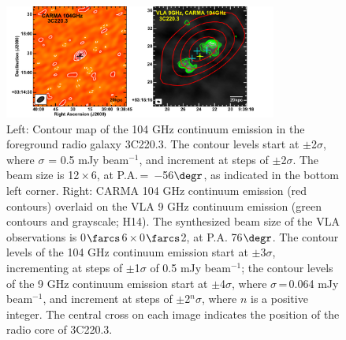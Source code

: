 \documentclass[twocolumn,apj,numberedappendix]{emulateapj}
\newcommand{\CO}{\mbox{CO($J$\,=\,3\,$\rightarrow$\,2) }}
\newcommand{\pmOne}{\mbox{$^{-1}$}}
\begin{document}
\begin{figure}[tbph]
\centering
\includegraphics[width=0.80\textwidth]{Figure/ContPanel.pdf}
\caption{Left: Contour map of the 104 GHz continuum emission in the foreground radio galaxy 3C220.3. 
The contour levels start at $\pm$2$\sigma$, where $\sigma$ = 0.5 mJy beam\pmOne, and 
increment at steps 
of $\pm$2$\sigma$. 
The beam size is 12\,$\times$\,6, at P.A.\,=\,
$-$56$\degr$, as indicated in the bottom left corner. Right: CARMA 104 GHz continuum emission (red contours) overlaid on the VLA 9 GHz continuum emission (green contours and grayscale; H14). 
The synthesized beam size of the VLA observations is 0$\farcs$6\,$\times$\,0$\farcs$2, at P.A. 
76$\degr$. The contour levels of the 104 GHz continuum emission start at $\pm$3$\sigma$, incrementing at steps 
of $\pm$1$\sigma$ of 0.5 mJy beam\pmOne; the contour levels of the 9 GHz continuum 
emission start at $\pm$4$\sigma$, where $\sigma$\,=\,0.064 mJy beam\pmOne, and increment at steps of $\pm$2$^n\sigma$, 
where $n$ is a positive integer.
The central cross on each image indicates the position of the radio core of 3C220.3. \label{fig:cont}}
\end{figure}
\end{document}
